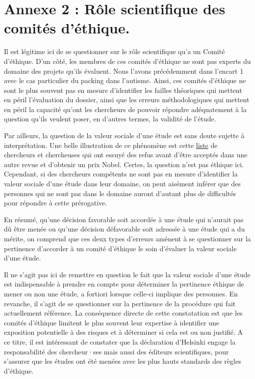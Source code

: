 \documentclass[
  12pt,
]{book}
\begin{document}
\section{Annexe 2 : Rôle scientifique des comités d'éthique.}\label{annexe-2-ruxf4le-scientifique-des-comituxe9s-duxe9thique.}

Il est légitime ici de se questionner sur le rôle scientifique qu'a un Comité d'éthique. D'un côté, les membres de ces comités d'éthique ne sont pas experts du domaine des projets qu'ils évaluent. Nous l'avons précédemment dans l'encart 1 avec le cas particulier du packing dans l'autisme. Ainsi, ces comités d'éthique ne sont le plus souvent pas en mesure d'identifier les failles théoriques qui mettent en péril l'évaluation du dossier, ainsi que les erreurs méthodologiques qui mettent en péril la capacité qu'ont les chercheurs de pouvoir répondre adéquatement à la question qu'ils veulent poser, en d'autres termes, la validité de l'étude.

Par ailleurs, la question de la valeur sociale d'une étude est sans doute sujette à interprétation. Une belle illustration de ce phénomène est cette \href{https://www.sciencealert.com/these-8-papers-were-rejected-before-going-on-to-win-the-nobel-prize}{liste} de chercheurs et chercheuses qui ont essuyé des refus avant d'être acceptés dans une autre revue et d'obtenir un prix Nobel. Certes, la question n'est pas éthique ici. Cependant, si des chercheurs compétents ne sont pas en mesure d'identifier la valeur sociale d'une étude dans leur domaine, on peut aisément inférer que des personnes qui ne sont pas dans le domaine auront d'autant plus de difficultés pour répondre à cette prérogative.

En résumé, qu'une décision favorable soit accordée à une étude qui n'aurait pas dû être menée ou qu'une décision défavorable soit adressée à une étude qui a du mérite, on comprend que ces deux types d'erreurs amènent à se questionner sur la pertinence d'accorder à un comité d'éthique le soin d'évaluer la valeur sociale d'une étude.

Il ne s'agit pas ici de remettre en question le fait que la valeur sociale d'une étude est indispensable à prendre en compte pour déterminer la pertinence éthique de mener ou non une étude, a fortiori lorsque celle-ci implique des personnes. En revanche, il s'agit de se questionner sur la pertinence de la procédure qui fait actuellement référence. La conséquence directe de cette constatation est que les comités d'éthique limitent le plus souvent leur expertise à identifier une exposition potentielle à des risques et à déterminer si cela est ou non justifié. A ce titre, il est intéressant de constater que la déclaration d'Helsinki engage la responsabilité des chercheur·ses mais aussi des éditeurs scientifiques, pour s'assurer que les études ont été menées avec les plus hauts standards des règles d'éthique.


\end{document}
